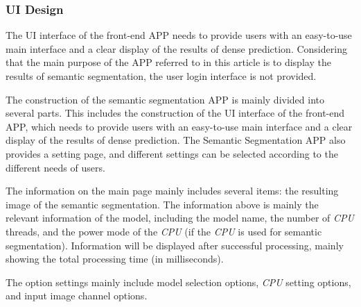 \subsubsection{UI Design}

The UI interface of the front-end APP needs to provide users with an easy-to-use main interface and a clear display of the results of dense prediction. Considering that the main purpose of the APP referred to in this article is to display the results of semantic segmentation, the user login interface is not provided.



The construction of the semantic segmentation APP is mainly divided into several parts. This includes the construction of the UI interface of the front-end APP, which needs to provide users with an easy-to-use main interface and a clear display of the results of dense prediction. The Semantic Segmentation APP also provides a setting page, and different settings can be selected according to the different needs of users.


The information on the main page mainly includes several items: the resulting image of the semantic segmentation. The information above is mainly the relevant information of the model, including the model name, the number of \textit{CPU} threads, and the power mode of the \textit{CPU} (if the \textit{CPU} is used for semantic segmentation). Information will be displayed after successful processing, mainly showing the total processing time (in milliseconds).


The option settings mainly include model selection options, \textit{CPU} setting options, and input image channel options.


